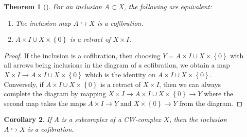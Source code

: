 \documentclass[reqno]{amsart}
\newtheorem{theorem}{Theorem}[section]
\newtheorem{corollary}[theorem]{Corollary}
\theoremstyle{definition}
\theoremstyle{remark}
\begin{document}
\begin{theorem}[]\label{Thm:Retract-cofibration}
    For an inclusion $A \subset X$, the following are equivalent:
    \begin{enumerate}
        \item The inclusion map $A \hookrightarrow X$ is a 
            cofibration.
        \item $A \times I \cup  X \times  \left\{ 0 \right\} $ 
            is a retract of $X \times I$.
    \end{enumerate}
\end{theorem}

\begin{proof}
    If the inclusion is a cofibration, then choosing
    $Y = A \times I \cup  X \times \left\{ 0 \right\} $ 
    with all arrows being inclusions in the
    diagram of a cofibration, we obtain a map
    $X \times I \to A \times I \cup  X \times \left\{ 0 \right\} $ 
    which is the identity on
    $A \times I \cup  X \times \left\{ 0 \right\} $.\\
    Conversely, if $A \times I \cup  X \times \left\{ 0 \right\} $ 
    is a retract of $X \times I$, then
    we can always complete the diagram by
    mapping $X \times I \to 
    A \times I \cup  X \times  \left\{ 0 \right\} 
    \to Y$ where the second map
    takes the maps $A \times I \to Y$ and
    $X \times \left\{ 0 \right\} \to Y$ from the diagram.
\end{proof}

\begin{corollary}\label{Cor:Subcomplex-Cofibration}
    If $A$ is a subcomplex of a CW-complex $X$, then
    the inclusion $A \hookrightarrow X$ is a cofibration.
\end{corollary}
\end{document}
